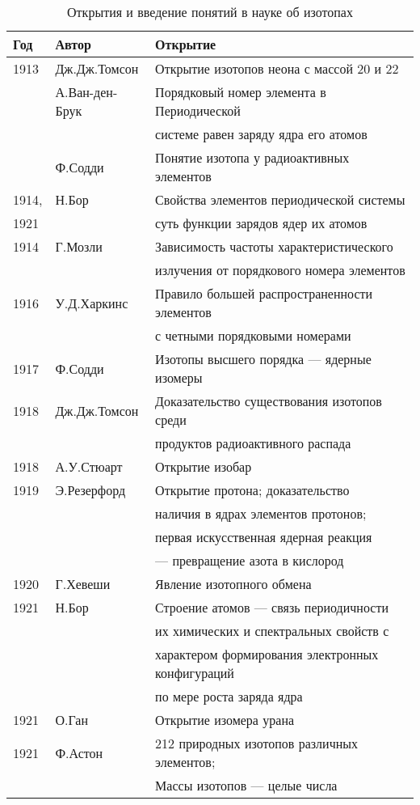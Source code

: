 \documentclass[a5paper,openany]{book}
\begin{document}
	\begin{table}[h]
		{\small	
				\begin{tabular}{l|l|l}
					Год & Автор	& Открытие \\
					\hline
					1913 & Дж.Дж.Томсон & Открытие {\color{red}изотопов} неона с массой 20 и 22\\
					~ & А.Ван-ден-Брук & {\color{red}Порядковый номер элемента в Периодической}  \\
					~ & ~ &  {\color{red}системе равен заряду ядра его 	атомов} \\
					~ & Ф.Содди & Понятие изотопа у радиоактивных
					элементов   \\
					1914, & Н.Бор & Свойства элементов периодической системы  \\
					1921 & ~ & суть  функции зарядов ядер их атомов \\
					1914 & Г.Мозли & Зависимость  частоты характеристического	  \\
					~ & ~ & излучения от порядкового номера элементов \\
					1916 & У.Д.Харкинс & {\color{red}Правило большей распространенности элементов}\\
					~ & ~ & {\color{red}с четными порядковыми номерами} \\
					1917 & Ф.Содди  & Изотопы высшего порядка --- ядерные изомеры\\
					1918 & Дж.Дж.Томсон  &  Доказательство существования изотопов среди\\
					~ & ~ & продуктов радиоактивного распада \\
					1918 & А.У.Стюарт  &  Открытие {\color{red}изобар}\\
					1919 &Э.Резерфорд &   Открытие протона; доказательство  \\
					~ & ~ & наличия в ядрах элементов протонов; \\
					~ & ~ & первая искусственная ядерная реакция \\
					~ & ~ & --- превращение азота в кислород \\
					1920 & Г.Хевеши & Явление изотопного обмена\\
					1921 & Н.Бор & Строение атомов --- связь периодичности  \\
					~ & ~ & их химических и спектральных свойств с \\
					~ & ~ &  характером формирования электронных конфигураций \\
					~ & ~ &  по мере роста заряда ядра \\
					1921 & О.Ган  & Открытие изомера урана\\
					1921 & Ф.Астон  & {\color{red}212 природных изотопов различных элементов;} \\
					~ & ~ &   {\color{red}Массы изотопов --- целые числа} \\
					\hline
				\end{tabular}
			}	
			\caption{Открытия и введение понятий в науке об изотопах}
			\label{t:IsotopeHistory}
		\end{table}
		
\end{document}
